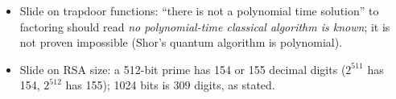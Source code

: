 \begin{fixbox}
\begin{itemize}[leftmargin=1.2em,itemsep=0pt]
  \item Slide on trapdoor functions: ``there is not a polynomial time solution'' to factoring should read \emph{no polynomial-time classical algorithm is known}; it is not proven impossible (Shor's quantum algorithm is polynomial).
  \item Slide on RSA size: a 512-bit prime has 154 or 155 decimal digits ($2^{511}$ has 154, $2^{512}$ has 155); 1024 bits is 309 digits, as stated.
\end{itemize}
\end{fixbox}
